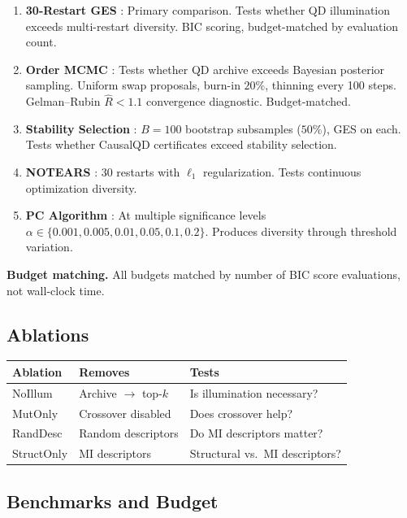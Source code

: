 \documentclass{article}
\theoremstyle{definition}
\theoremstyle{plain}
\theoremstyle{remark}
\begin{document}
\begin{enumerate}
  \item \textbf{30-Restart GES} \citep{chickering2002optimal}: Primary
    comparison. Tests whether QD illumination exceeds multi-restart diversity.
    BIC scoring, budget-matched by evaluation count.
  \item \textbf{Order MCMC} \citep{friedman2003being}: Tests whether QD archive
    exceeds Bayesian posterior sampling. Uniform swap proposals, burn-in $20\%$,
    thinning every 100 steps. Gelman--Rubin $\hat{R} < 1.1$ convergence
    diagnostic. Budget-matched.
  \item \textbf{Stability Selection} \citep{meinshausen2010stability}: $B = 100$
    bootstrap subsamples ($50\%$), GES on each. Tests whether CausalQD
    certificates exceed stability selection.
  \item \textbf{NOTEARS} \citep{zheng2018dags}: 30 restarts with $\ell_1$
    regularization. Tests continuous optimization diversity.
  \item \textbf{PC Algorithm} \citep{spirtes2000causation}: At multiple
    significance levels $\alpha \in \{0.001, 0.005, 0.01, 0.05, 0.1, 0.2\}$. Produces
    diversity through threshold variation.
\end{enumerate}

\textbf{Budget matching.} All budgets matched by number of BIC score evaluations,
not wall-clock time.

\subsection{Ablations}

\begin{tabular}{llp{7cm}}
\toprule
\textbf{Ablation} & \textbf{Removes} & \textbf{Tests} \\
\midrule
NoIllum & Archive $\to$ top-$k$ & Is illumination necessary? \\
MutOnly & Crossover disabled & Does crossover help? \\
RandDesc & Random descriptors & Do MI descriptors matter? \\
StructOnly & MI descriptors & Structural vs.\ MI descriptors? \\
\bottomrule
\end{tabular}

\subsection{Benchmarks and Budget}
\end{document}
